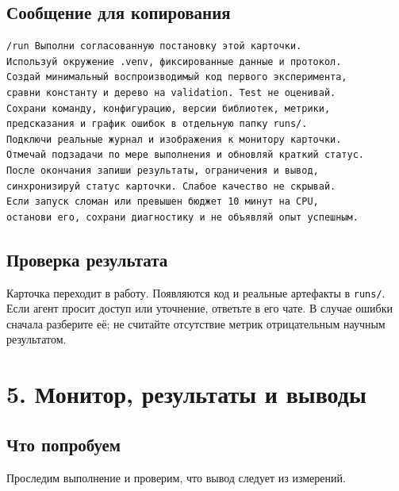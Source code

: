 \documentclass[10pt,a4paper]{article}
\begin{document}
\subsection*{Сообщение для копирования}
\begin{promptbox}
\begin{Verbatim}
/run Выполни согласованную постановку этой карточки.
Используй окружение .venv, фиксированные данные и протокол.
Создай минимальный воспроизводимый код первого эксперимента,
сравни константу и дерево на validation. Test не оценивай.
Сохрани команду, конфигурацию, версии библиотек, метрики,
предсказания и график ошибок в отдельную папку runs/.
Подключи реальные журнал и изображения к монитору карточки.
Отмечай подзадачи по мере выполнения и обновляй краткий статус.
После окончания запиши результаты, ограничения и вывод,
синхронизируй статус карточки. Слабое качество не скрывай.
Если запуск сломан или превышен бюджет 10 минут на CPU,
останови его, сохрани диагностику и не объявляй опыт успешным.
\end{Verbatim}
\end{promptbox}
\subsection*{Проверка результата}
Карточка переходит в работу. Появляются код и реальные артефакты в \texttt{runs/}. Если агент просит доступ или уточнение, ответьте в его чате. В случае ошибки сначала разберите её; не считайте отсутствие метрик отрицательным научным результатом.


\clearpage
\section{5. Монитор, результаты и выводы}
\subsection*{Что попробуем}
Проследим выполнение и проверим, что вывод следует из измерений.
\end{document}

